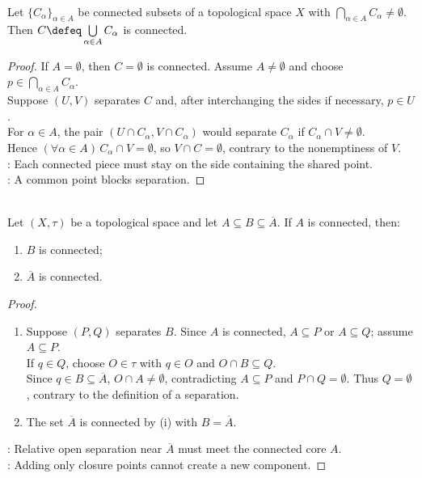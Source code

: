 \begin{proposition} \label{prop:connected-union-common-point} \\
Let $\{C_\alpha\}_{\alpha\in A}$ be connected subsets of a topological space $X$ with $\bigcap\limits_{\alpha\in A}C_\alpha\neq\emptyset$. Then $C\defeq\bigcup\limits_{\alpha\in A}C_\alpha$ is connected.
\begin{proof}
If $A=\emptyset$, then $C=\emptyset$ is connected. Assume $A\neq\emptyset$ and choose $p\in\bigcap\limits_{\alpha\in A}C_\alpha$.\\
Suppose $(U,V)$ separates $C$ and, after interchanging the sides if necessary, $p\in U$.\\
For $\alpha\in A$, the pair $(U\cap C_\alpha,V\cap C_\alpha)$ would separate $C_\alpha$ if $C_\alpha\cap V\neq\emptyset$.\\
Hence $(\forall\alpha\in A)\,C_\alpha\cap V=\emptyset$, so $V\cap C=\emptyset$, contrary to the nonemptiness of $V$.\\
: Each connected piece must stay on the side containing the shared point.\\
: A common point blocks separation.
\end{proof}
\end{proposition}

\begin{proposition} \label{prop:connected-closure-sandwich} \\
Let $(X,\tau)$ be a topological space and let $A\subseteq B\subseteq\overline{A}$. If $A$ is connected, then:
\begin{enumerate}[label=(\roman*)]
\setlength{\itemsep}{0pt}
\item $B$ is connected;
\item $\overline{A}$ is connected.
\end{enumerate}
\begin{proof}
\begin{enumerate}[label=(\roman*)]
\setlength{\itemsep}{0pt}
\item Suppose $(P,Q)$ separates $B$. Since $A$ is connected, $A\subseteq P$ or $A\subseteq Q$; assume $A\subseteq P$.\\
If $q\in Q$, choose $O\in\tau$ with $q\in O$ and $O\cap B\subseteq Q$.\\
Since $q\in B\subseteq\overline{A}$, $O\cap A\neq\emptyset$, contradicting $A\subseteq P$ and $P\cap Q=\emptyset$. Thus $Q=\emptyset$, contrary to the definition of a separation.
\item The set $\overline{A}$ is connected by (i) with $B=\overline{A}$.
\end{enumerate}
: Relative open separation near $\overline{A}$ must meet the connected core $A$.\\
: Adding only closure points cannot create a new component.
\end{proof}
\end{proposition}


